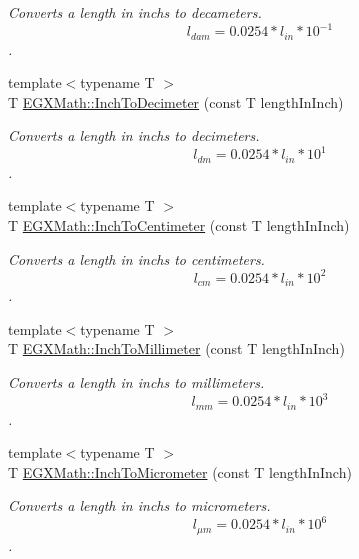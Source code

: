 \begin{DoxyCompactItemize}
\begin{DoxyCompactList}\small\item\em Converts a length in inchs to decameters. \[ l_{dam}=0.0254 * l_{in} * 10^{-1} \]. \end{DoxyCompactList}\item 
{\footnotesize template$<$typename T $>$ }\\T \mbox{\hyperlink{group___e_g_x_math-_conversions-_length_conversions-_imperial-_inch-_s_i_ga8a9bfe2e6e472e66f92146b5b867264b}{E\+G\+X\+Math\+::\+Inch\+To\+Decimeter}} (const T length\+In\+Inch)
\begin{DoxyCompactList}\small\item\em Converts a length in inchs to decimeters. \[ l_{dm}=0.0254 * l_{in} * 10^{1} \]. \end{DoxyCompactList}\item 
{\footnotesize template$<$typename T $>$ }\\T \mbox{\hyperlink{group___e_g_x_math-_conversions-_length_conversions-_imperial-_inch-_s_i_ga1a0fb189a0eb34f55a021d8372191f8e}{E\+G\+X\+Math\+::\+Inch\+To\+Centimeter}} (const T length\+In\+Inch)
\begin{DoxyCompactList}\small\item\em Converts a length in inchs to centimeters. \[ l_{cm}=0.0254 * l_{in} * 10^{2} \]. \end{DoxyCompactList}\item 
{\footnotesize template$<$typename T $>$ }\\T \mbox{\hyperlink{group___e_g_x_math-_conversions-_length_conversions-_imperial-_inch-_s_i_ga62adb6084de8b6ff26107bdfeb4144f2}{E\+G\+X\+Math\+::\+Inch\+To\+Millimeter}} (const T length\+In\+Inch)
\begin{DoxyCompactList}\small\item\em Converts a length in inchs to millimeters. \[ l_{mm}=0.0254 * l_{in} * 10^{3} \]. \end{DoxyCompactList}\item 
{\footnotesize template$<$typename T $>$ }\\T \mbox{\hyperlink{group___e_g_x_math-_conversions-_length_conversions-_imperial-_inch-_s_i_ga664100ea5f92f4e92686e217e996b475}{E\+G\+X\+Math\+::\+Inch\+To\+Micrometer}} (const T length\+In\+Inch)
\begin{DoxyCompactList}\small\item\em Converts a length in inchs to micrometers. \[ l_{\mu m}=0.0254 * l_{in} * 10^{6} \]. \end{DoxyCompactList}\item 

\end{DoxyCompactItemize}
